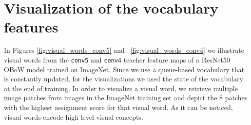 \documentclass[final]{cvpr}
\newcommand{\resnetfifty}{ResNet50\xspace}
\begin{document}
\section{Visualization of the vocabulary features}

In Figures \ref{fig:visual_words_conv5} and ~\ref{fig:visual_words_conv4} we illustrate visual words from the \texttt{conv5} and \texttt{conv4} teacher feature maps of a \resnetfifty OBoW model trained on ImageNet.
Since we use a queue-based vocabulary that is constantly updated, 
for the visualizations we used the state of the vocabulary at the end of training.
In order to visualize a visual word, we retrieve multiple image patches from images in the ImageNet training set and depict the 8 patches with the highest assignment score for that visual word.
As it can be noticed, visual words encode high level visual concepts.
\end{document}
